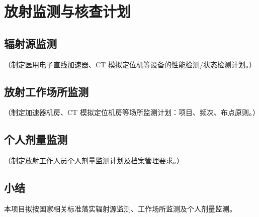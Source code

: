 \chapter{放射监测与核查计划}

\section{辐射源监测}

（制定医用电子直线加速器、CT 模拟定位机等设备的性能检测/状态检测计划。）

\section{放射工作场所监测}

（制定加速器机房、CT 模拟定位机房等场所监测计划：项目、频次、布点原则。）

\section{个人剂量监测}

（制定放射工作人员个人剂量监测计划及档案管理要求。）

\section{小结}

本项目拟按国家相关标准落实辐射源监测、工作场所监测及个人剂量监测。
